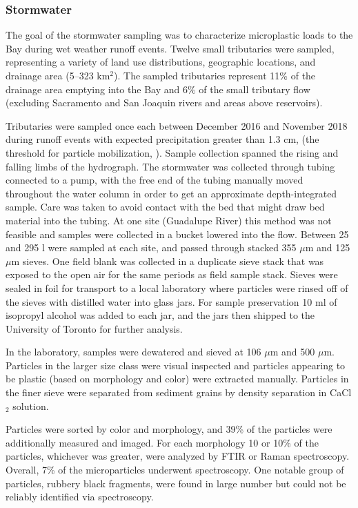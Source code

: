 \documentclass[draft]{jgr/agujournal2019}
\begin{document}
\subsubsection{Stormwater}

The goal of the stormwater sampling was to characterize microplastic
loads to the Bay during wet weather runoff events. Twelve small
tributaries were sampled, representing a variety of land use
distributions, geographic locations, and drainage area (5--323
km$^2$).  The sampled tributaries represent 11\% of the drainage area
emptying into the Bay and 6\% of the small tributary flow (excluding
Sacramento and San Joaquin rivers and areas above reservoirs).

Tributaries were sampled once each between December 2016 and November
2018 during runoff events with expected precipitation greater than 1.3
cm, (the threshold for particle mobilization,
).  Sample collection spanned the rising and
falling limbs of the hydrograph.  The stormwater was collected through
tubing connected to a pump, with the free end of the tubing manually
moved throughout the water column in order to get an approximate
depth-integrated sample. Care was taken to avoid contact with the bed
that might draw bed material into the tubing. At one site (Guadalupe
River) this method was not feasible and samples were collected in a
bucket lowered into the flow. Between 25 and 295 l were sampled at
each site, and passed through stacked 355 $\mu\textrm{m}$ and 125
$\mu\textrm{m}$ sieves. One field blank was collected in a duplicate
sieve stack that was exposed to the open air for the same periods as
field sample stack.  Sieves were sealed in foil for transport to a
local laboratory where particles were rinsed off of the sieves with
distilled water into glass jars. For sample preservation 10 ml of
isopropyl alcohol was added to each jar, and the jars then shipped to
the University of Toronto for further analysis.

In the laboratory, samples were dewatered and sieved at 106
$\mu\textrm{m}$ and 500 $\mu\textrm{m}$. Particles in the larger size
class were visual inspected and particles appearing to be plastic
(based on morphology and color) were extracted manually. Particles
in the finer sieve were separated from sediment grains by density
separation in CaCl$_2$ solution.

Particles were sorted by color and morphology, and 39\% of the
particles were additionally measured and imaged. For each
morphology
10 or 10\% of the particles, whichever was greater, were analyzed
by FTIR or Raman spectroscopy. Overall, 7\% of the microparticles
underwent spectroscopy. One notable group of particles, rubbery
black fragments, were found in large number but could not be
reliably identified via spectroscopy.
\end{document}
